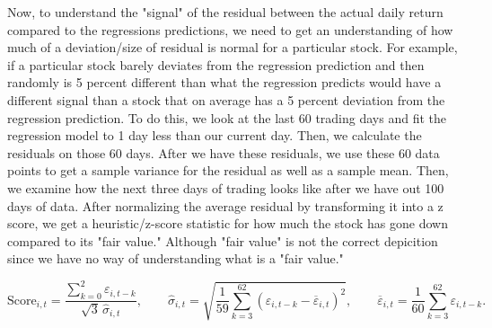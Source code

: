 \documentclass[12pt,letterpaper]{article}
\begin{document}
Now, to understand the "signal" of the residual between the actual daily return compared to the regressions predictions, we need to get an understanding of how much of a deviation/size of residual is normal for a particular stock. For example, if a particular stock barely deviates from the regression prediction and then randomly is 5 percent different than what the regression predicts would have a different signal than a stock that on average has a 5 percent deviation from the regression prediction. To do this, we look at the last 60 trading days and fit the regression model to 1 day less than our current day. Then, we calculate the residuals on those 60 days. After we have these residuals, we use these 60 data points to get a sample variance for the residual as well as a sample mean. Then, we examine how the next three days of trading looks like after we have out 100 days of data. After normalizing the average residual by transforming it into a z score, we get a heuristic/z-score statistic for how much the stock has gone down compared to its "fair value." Although "fair value" is not the correct depicition since we have no way of understanding what is a "fair value." 

\[
\mathrm{Score}_{i,t}
=
\frac{\displaystyle\sum_{k=0}^{2}\varepsilon_{i,t-k}}
     {\sqrt{3}\,\widehat{\sigma}_{i,t}},
\qquad
\widehat{\sigma}_{i,t}
=
\sqrt{\frac{1}{59}
\sum_{k=3}^{62}
\left(\varepsilon_{i,t-k}-\overline{\varepsilon}_{i,t}\right)^2},
\qquad
\overline{\varepsilon}_{i,t}
=
\frac{1}{60}\sum_{k=3}^{62}\varepsilon_{i,t-k}.
\]
\end{document}
